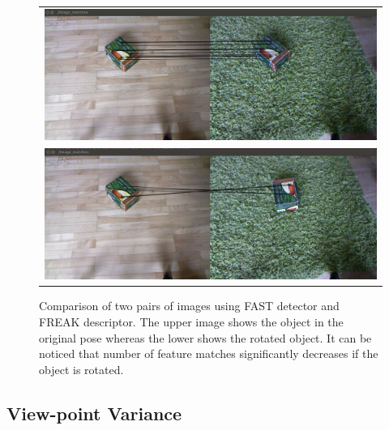 \begin{figure}
\centering
    \begin{tabular}{c}
 

\includegraphics[width=0.7\columnwidth]{figures/freak-no-rotation.png}\\
\includegraphics[width=0.7\columnwidth]{figures/freak-rotation.png}\\
    \end{tabular}


\caption{Comparison of two pairs of images using FAST detector and FREAK descriptor. The upper image shows the object in the original pose whereas the lower shows the rotated object. It can be noticed that number of feature matches significantly decreases if the object is rotated. }
\label{fig:freak-features}
\end{figure}

 





\subsection{View-point Variance}

